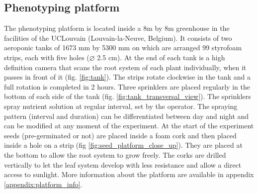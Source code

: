 \subsection{Phenotyping platform}
The phenotyping platform is located inside a 8m by 8m greenhouse in the facilities of the UCLouvain (Louvain-la-Neuve, Belgium). It consists of two aeroponic tanks of 1673 mm by 5300 mm on which are arranged 99 styrofoam strips, each with five holes ($\diameter$ 2.5 cm). At the end of each tank is a high definition camera that scans the root system of each plant individually, when it passes in front of it (fig. \ref{fig:tank}). The strips rotate clockwise in the tank and a full rotation is completed in 2 hours. Three sprinklers are placed regularly in the bottom of each side of the tank (fig. \ref{fig:tank_transversal_view}). The sprinklers spray nutrient solution at regular interval, set by the operator. The spraying pattern (interval and duration) can be differentiated between day and night and can be modified at any moment of the experiment. At the start of the experiment seeds (pre-germinated or not) are placed inside a foam cork and then placed inside a hole on a strip (fig \ref{fig:seed_platform_close_up}). They are placed at the bottom to allow the root system to grow freely. The corks are drilled vertically to let the leaf system develop with less resistance and allow a direct access to sunlight. More information about the platform are available in appendix \ref{appendix:platform_info}.

